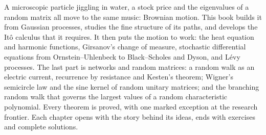 A microscopic particle jiggling in water, a stock price and the eigenvalues of a random matrix all move to the same music: Brownian motion. This book builds it from Gaussian processes, studies the fine structure of its
paths, and develops the It\^o calculus that it requires. It then puts the motion to work: the heat equation and harmonic
functions, Girsanov's change of measure, stochastic differential equations from Ornstein--Uhlenbeck to Black--Scholes and
Dyson, and L\'evy processes.
The last part is networks and random matrices: a random walk as an electric current, recurrence by resistance and Kesten's theorem; Wigner's semicircle law and the sine kernel of random unitary matrices; and the branching random walk that governs the largest values of a random characteristic polynomial. Every theorem is proved, with one
marked exception at the research frontier. Each chapter opens with the story behind its ideas, ends with exercises and
complete solutions.
